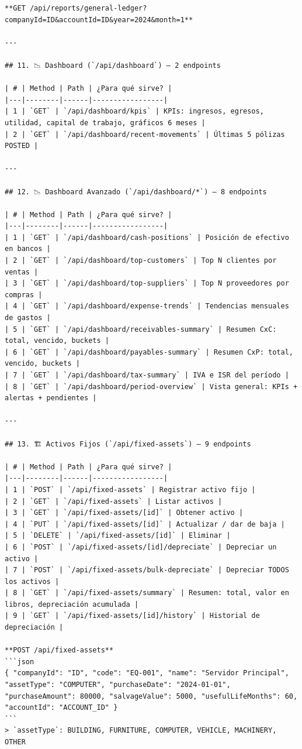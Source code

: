 \documentclass[12pt, a4paper, oneside]{book}
\begin{document}
\begin{lstlisting}
**GET /api/reports/general-ledger?companyId=ID&accountId=ID&year=2024&month=1**

---

## 11. 📉 Dashboard (`/api/dashboard`) — 2 endpoints

| # | Method | Path | ¿Para qué sirve? |
|---|--------|------|-----------------|
| 1 | `GET` | `/api/dashboard/kpis` | KPIs: ingresos, egresos, utilidad, capital de trabajo, gráficos 6 meses |
| 2 | `GET` | `/api/dashboard/recent-movements` | Últimas 5 pólizas POSTED |

---

## 12. 📉 Dashboard Avanzado (`/api/dashboard/*`) — 8 endpoints

| # | Method | Path | ¿Para qué sirve? |
|---|--------|------|-----------------|
| 1 | `GET` | `/api/dashboard/cash-positions` | Posición de efectivo en bancos |
| 2 | `GET` | `/api/dashboard/top-customers` | Top N clientes por ventas |
| 3 | `GET` | `/api/dashboard/top-suppliers` | Top N proveedores por compras |
| 4 | `GET` | `/api/dashboard/expense-trends` | Tendencias mensuales de gastos |
| 5 | `GET` | `/api/dashboard/receivables-summary` | Resumen CxC: total, vencido, buckets |
| 6 | `GET` | `/api/dashboard/payables-summary` | Resumen CxP: total, vencido, buckets |
| 7 | `GET` | `/api/dashboard/tax-summary` | IVA e ISR del período |
| 8 | `GET` | `/api/dashboard/period-overview` | Vista general: KPIs + alertas + pendientes |

---

## 13. 🏗️ Activos Fijos (`/api/fixed-assets`) — 9 endpoints

| # | Method | Path | ¿Para qué sirve? |
|---|--------|------|-----------------|
| 1 | `POST` | `/api/fixed-assets` | Registrar activo fijo |
| 2 | `GET` | `/api/fixed-assets` | Listar activos |
| 3 | `GET` | `/api/fixed-assets/[id]` | Obtener activo |
| 4 | `PUT` | `/api/fixed-assets/[id]` | Actualizar / dar de baja |
| 5 | `DELETE` | `/api/fixed-assets/[id]` | Eliminar |
| 6 | `POST` | `/api/fixed-assets/[id]/depreciate` | Depreciar un activo |
| 7 | `POST` | `/api/fixed-assets/bulk-depreciate` | Depreciar TODOS los activos |
| 8 | `GET` | `/api/fixed-assets/summary` | Resumen: total, valor en libros, depreciación acumulada |
| 9 | `GET` | `/api/fixed-assets/[id]/history` | Historial de depreciación |

**POST /api/fixed-assets**
```json
{ "companyId": "ID", "code": "EQ-001", "name": "Servidor Principal", "assetType": "COMPUTER", "purchaseDate": "2024-01-01", "purchaseAmount": 80000, "salvageValue": 5000, "usefulLifeMonths": 60, "accountId": "ACCOUNT_ID" }
```
> `assetType`: BUILDING, FURNITURE, COMPUTER, VEHICLE, MACHINERY, OTHER


\end{lstlisting}
\end{document}
